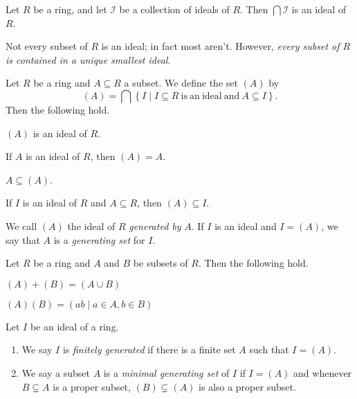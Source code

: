 \begin{prop}
Let \(R\) be a ring, and let \(\mathcal{I}\) be a collection of ideals of \(R\).
Then \(\bigcap \mathcal{I}\) is an ideal of \(R\).
\end{prop}

Not every subset of \(R\) is an ideal; in fact most aren't.
However, \emph{every subset of \(R\) is contained in a unique smallest ideal}.

\begin{prop}
Let \(R\) be a ring and \(A \subseteq R\) a subset.
We define the set \((A)\) by \[ (A) = \bigcap \left\{ I \mid I \subseteq R\ \mathrm{is\ an\ ideal\ and}\ A \subseteq I \right\}. \]
Then the following hold.
\begin{proplist}
\item \((A)\) is an ideal of \(R\).
\item If \(A\) is an ideal of \(R\), then \((A) = A\).
\item \(A \subseteq (A)\).
\item If \(I\) is an ideal of \(R\) and \(A \subseteq R\), then \((A) \subseteq I\).
\end{proplist}
We call \((A)\) the ideal of \(R\) \emph{generated by} \(A\).
If \(I\) is an ideal and \(I = (A)\), we say that \(A\) is a \emph{generating set} for \(I\).
\end{prop}

\begin{prop}
Let \(R\) be a ring and \(A\) and \(B\) be subsets of \(R\).
Then the following hold.
\begin{proplist}
\item \((A) + (B) = (A \cup B)\)
\item \((A)(B) = (ab \mid a \in A, b \in B)\)
\end{proplist}
\end{prop}

\begin{dfn}
Let \(I\) be an ideal of a ring.
\begin{enumerate}
\item We say \(I\) is \emph{finitely generated} if there is a finite set \(A\) such that \(I = (A)\).
\item We say a subset \(A\) is a \emph{minimal generating set} of \(I\) if \(I = (A)\) and whenever \(B \subsetneq A\) is a proper subset, \((B) \subsetneq (A)\) is also a proper subset.
\end{enumerate}
\end{dfn}

